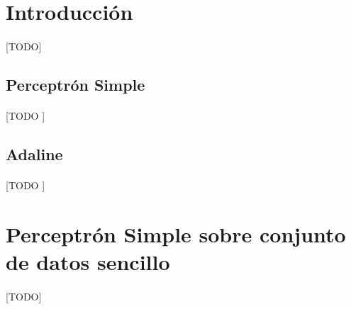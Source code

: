 \documentclass{article}
\begin{document}
	\maketitle %

	\thispagestyle{fancy} %



	\begin{abstract}
		\noindent [TODO ]
	\end{abstract}



	\section{Introducción}
	\label{sec:introducción}

		\paragraph{}
		[TODO]

		\subsection{Perceptrón Simple}
		\label{sec:simple_perceptron}

			\paragraph{}
			[TODO ]


		\subsection{Adaline}
		\label{sec:adaline}

			\paragraph{}
			[TODO ]

	\section{Perceptrón Simple sobre conjunto de datos sencillo}
	\label{sec:e1}

		\paragraph{}
		[TODO]
\end{document}
